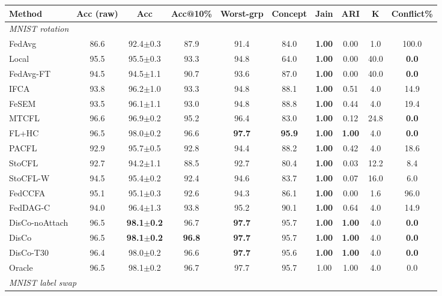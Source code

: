 \scriptsize
\setlength{\tabcolsep}{3.2pt}
\begin{tabular}{lccccccccc}
\toprule
Method & Acc (raw) & Acc & Acc@10\% & Worst-grp & Concept & Jain & ARI & K & Conflict\% \\
\midrule
\multicolumn{10}{l}{\textit{MNIST rotation}}\\
FedAvg & 86.6 & 92.4$\pm$0.3 & 87.9 & 91.4 & 84.0 & \textbf{1.00} & 0.00 & 1.0 & 100.0 \\
Local & 95.5 & 95.5$\pm$0.3 & 93.3 & 94.8 & 64.0 & \textbf{1.00} & 0.00 & 40.0 & \textbf{0.0} \\
FedAvg-FT & 94.5 & 94.5$\pm$1.1 & 90.7 & 93.6 & 87.0 & \textbf{1.00} & 0.00 & 40.0 & \textbf{0.0} \\
IFCA & 93.8 & 96.2$\pm$1.0 & 93.3 & 94.8 & 88.1 & \textbf{1.00} & 0.51 & 4.0 & 14.9 \\
FeSEM & 93.5 & 96.1$\pm$1.1 & 93.0 & 94.8 & 88.8 & \textbf{1.00} & 0.44 & 4.0 & 19.4 \\
MTCFL & 96.6 & 96.9$\pm$0.2 & 95.2 & 96.4 & 83.0 & \textbf{1.00} & 0.12 & 24.8 & \textbf{0.0} \\
FL+HC & 96.5 & 98.0$\pm$0.2 & 96.6 & \textbf{97.7} & \textbf{95.9} & \textbf{1.00} & \textbf{1.00} & 4.0 & \textbf{0.0} \\
PACFL & 92.9 & 95.7$\pm$0.5 & 92.8 & 94.4 & 88.2 & \textbf{1.00} & 0.42 & 4.0 & 18.6 \\
StoCFL & 92.7 & 94.2$\pm$1.1 & 88.5 & 92.7 & 80.4 & \textbf{1.00} & 0.03 & 12.2 & 8.4 \\
StoCFL-W & 94.5 & 95.4$\pm$0.2 & 92.4 & 94.6 & 83.7 & \textbf{1.00} & 0.07 & 16.0 & 6.0 \\
FedCCFA & 95.1 & 95.1$\pm$0.3 & 92.6 & 94.3 & 86.1 & \textbf{1.00} & 0.00 & 1.6 & 96.0 \\
FedDAG-C & 94.0 & 96.4$\pm$1.3 & 93.8 & 95.2 & 90.1 & \textbf{1.00} & 0.64 & 4.0 & 14.9 \\
DisCo-noAttach & 96.5 & \textbf{98.1$\pm$0.2} & 96.7 & \textbf{97.7} & 95.7 & \textbf{1.00} & \textbf{1.00} & 4.0 & \textbf{0.0} \\
DisCo & 96.5 & \textbf{98.1$\pm$0.2} & \textbf{96.8} & \textbf{97.7} & 95.7 & \textbf{1.00} & \textbf{1.00} & 4.0 & \textbf{0.0} \\
DisCo-T30 & 96.4 & 98.0$\pm$0.2 & 96.6 & \textbf{97.7} & 95.6 & \textbf{1.00} & \textbf{1.00} & 4.0 & \textbf{0.0} \\
Oracle & 96.5 & 98.1$\pm$0.2 & 96.7 & 97.7 & 95.7 & 1.00 & 1.00 & 4.0 & 0.0 \\
\midrule
\multicolumn{10}{l}{\textit{MNIST label swap}}\\

\end{tabular}
